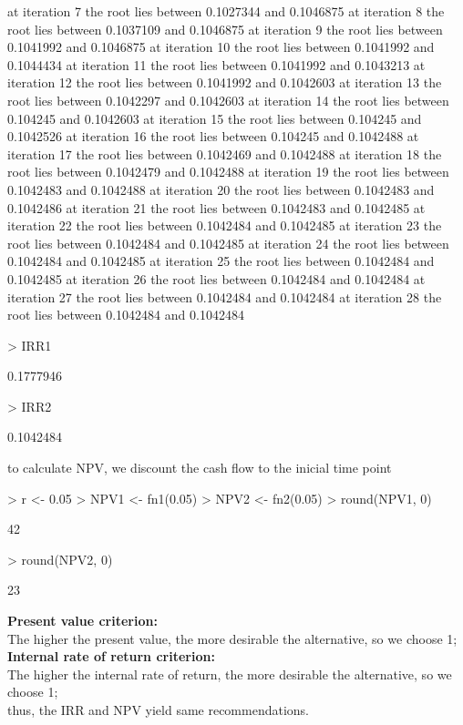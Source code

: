 \documentclass[a4paper,12pt]{article}
\begin{document}
\begin{Schunk}
\begin{Soutput}
at iteration 7 the root lies between 0.1027344 and 0.1046875
at iteration 8 the root lies between 0.1037109 and 0.1046875
at iteration 9 the root lies between 0.1041992 and 0.1046875
at iteration 10 the root lies between 0.1041992 and 0.1044434
at iteration 11 the root lies between 0.1041992 and 0.1043213
at iteration 12 the root lies between 0.1041992 and 0.1042603
at iteration 13 the root lies between 0.1042297 and 0.1042603
at iteration 14 the root lies between 0.104245 and 0.1042603
at iteration 15 the root lies between 0.104245 and 0.1042526
at iteration 16 the root lies between 0.104245 and 0.1042488
at iteration 17 the root lies between 0.1042469 and 0.1042488
at iteration 18 the root lies between 0.1042479 and 0.1042488
at iteration 19 the root lies between 0.1042483 and 0.1042488
at iteration 20 the root lies between 0.1042483 and 0.1042486
at iteration 21 the root lies between 0.1042483 and 0.1042485
at iteration 22 the root lies between 0.1042484 and 0.1042485
at iteration 23 the root lies between 0.1042484 and 0.1042485
at iteration 24 the root lies between 0.1042484 and 0.1042485
at iteration 25 the root lies between 0.1042484 and 0.1042485
at iteration 26 the root lies between 0.1042484 and 0.1042484
at iteration 27 the root lies between 0.1042484 and 0.1042484
at iteration 28 the root lies between 0.1042484 and 0.1042484
\end{Soutput}
\begin{Sinput}
> IRR1
\end{Sinput}
\begin{Soutput}
[1] 0.1777946
\end{Soutput}
\begin{Sinput}
> IRR2
\end{Sinput}
\begin{Soutput}
[1] 0.1042484
\end{Soutput}
\end{Schunk}
to calculate NPV, we discount the cash flow to the inicial time point
\begin{Schunk}
\begin{Sinput}
> r <- 0.05
> NPV1 <- fn1(0.05)
> NPV2 <- fn2(0.05)
> round(NPV1, 0)
\end{Sinput}
\begin{Soutput}
[1] 42
\end{Soutput}
\begin{Sinput}
> round(NPV2, 0)
\end{Sinput}
\begin{Soutput}
[1] 23
\end{Soutput}
\end{Schunk}
\noindent\textbf{Present value criterion:}\\
\noindent The higher the present value, the more desirable the alternative, so we choose 1;\\
\noindent\textbf{Internal rate of return criterion:}\\
\noindent The higher the internal rate of return, the more desirable the alternative, so we choose 1;\\
thus, the IRR and NPV yield same recommendations. \\
\end{document}
